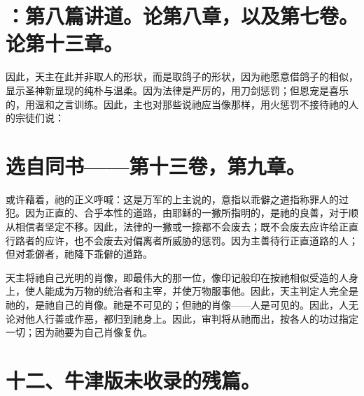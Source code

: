 
\section{：第八篇讲道。论第八章，以及第七卷。论第十三章。}

因此，天主在此并非取人的形状，而是取鸽子的形状，因为祂愿意借鸽子的相似，显示圣神新显现的纯朴与温柔。因为法律是严厉的，用刀剑惩罚；但恩宠是喜乐的，用温和之言训练。因此，主也对那些说祂应当像那样，用火惩罚不接待祂的人的宗徒们说：\par


\section{选自同书——第十三卷，第九章。}

或许藉着，祂的正义呼喊：这是万军的上主说的，意指以乖僻之道指称罪人的过犯。因为正直的、合乎本性的道路，由耶稣的一撇所指明的，是祂的良善，对于顺从相信者坚定不移。因此，法律的一撇或一捺都不会废去；既不会废去应许给正直行路者的应许，也不会废去对偏离者所威胁的惩罚。因为主善待行正直道路的人；但对乖僻者，祂降下乖僻的道路。\par

天主将祂自己光明的肖像，即最伟大的那一位，像印记般印在按祂相似受造的人身上，使人能成为万物的统治者和主宰，并使万物服事他。因此，天主判定人完全是祂的，是祂自己的肖像。祂是不可见的；但祂的肖像——人是可见的。因此，人无论对他人行善或作恶，都归到祂身上。因此，审判将从祂而出，按各人的功过指定一切；因为祂要为自己肖像复仇。\par


\section{十二、牛津版未收录的残篇。}

